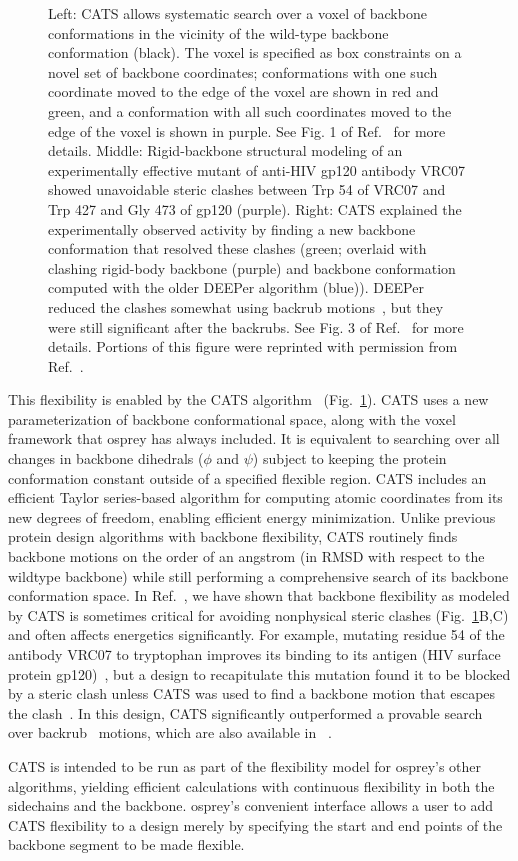 \begin{figure}
\caption{Left: CATS allows systematic search over a voxel of backbone conformations in the vicinity of the wild-type backbone conformation (black).  The voxel is specified as box constraints on a novel set of backbone coordinates; conformations with one such coordinate moved to the edge of the voxel are shown in red and green, and a conformation with all such coordinates moved to the edge of the voxel is shown in purple.  See Fig. 1 of Ref.~ for more details.  Middle: Rigid-backbone structural modeling of an experimentally effective mutant of anti-HIV gp120 antibody VRC07 showed unavoidable steric clashes between Trp 54 of VRC07 and Trp 427 and Gly 473 of gp120 (purple).  Right: CATS explained the experimentally observed activity by finding a new backbone conformation that resolved these clashes (green; overlaid with clashing rigid-body backbone (purple) and backbone conformation computed with the older DEEPer algorithm (blue)).  DEEPer reduced the clashes somewhat using backrub motions~\cite{backrub}, but they were still significant after the backrubs.  See Fig. 3 of Ref.~ for more details.   Portions of this figure were reprinted with permission from Ref.~.  }
\label{fig:cats}
\end{figure}

This flexibility is enabled by the CATS algorithm~\cite{CATS} (Fig.~\ref{fig:cats}).  CATS uses a new parameterization of backbone conformational space, along with the voxel framework that {\sc osprey} has always included.  It is equivalent to searching over all changes in backbone dihedrals ($\phi$ and $\psi$) subject to keeping the protein conformation constant outside of a specified flexible region. CATS includes an efficient Taylor series-based algorithm for computing atomic coordinates from its new degrees of freedom, enabling efficient energy minimization.  Unlike previous protein design algorithms with backbone flexibility, CATS routinely finds backbone motions on the order of an angstrom (in RMSD with respect to the wildtype backbone) while still performing a comprehensive search of its backbone conformation space.  In Ref.~, we have shown that backbone flexibility as modeled by CATS is sometimes critical for avoiding nonphysical steric clashes (Fig.~\ref{fig:cats}B,C) and often affects energetics significantly.  For example, mutating residue 54 of the antibody VRC07 to tryptophan improves its binding to its antigen (HIV surface protein gp120)~\cite{VRC07_enhance}, but a design to recapitulate this mutation found it to be blocked by a steric clash unless CATS was used to find a backbone motion that escapes the clash~\cite{CATS}.  In this design, CATS significantly outperformed a provable search over backrub~\cite{backrub} motions, which are also available in \osprey~\cite{BRDEE,DEEPer}.  

CATS is intended to be run as part of the flexibility model for {\sc osprey}'s other algorithms, yielding efficient calculations with continuous flexibility in both the sidechains and the backbone. {\sc osprey}'s convenient interface allows a user to add CATS flexibility to a design merely by specifying the start and end points of the backbone segment to be made flexible.  
